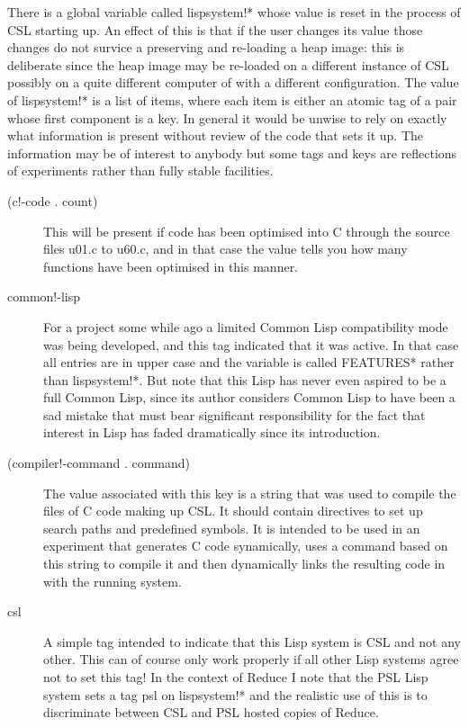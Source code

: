 \documentclass[a4paper,11pt]{article}
\begin{document}
There is a global variable called {\ttfamily lispsystem!*} whose value is
reset in the process of CSL starting up. An effect of this is that if the
user changes its value those changes do not survice a preserving and
re-loading a heap image: this is deliberate since the heap image may be
re-loaded on a different instance of CSL possibly on a quite different
computer of with a different configuration. The value of {\ttfamily
lispsystem!*} is a list of items, where each item is either an atomic tag
of a pair whose first component is a key. In general it would be unwise
to rely on exactly what information is present without review of the code
that sets it up. The information may be of interest to anybody but some tags
and keys are reflections of experiments rather than fully stable facilities.
\begin{description}

\item[{\ttfamily (c!-code . count)}]
This will be present if code has been optimised into C through the source
files u01.c to u60.c, and in that case the value tells you how many functions
have been optimised in this manner.
  

\item[{\ttfamily  common!-lisp}]
For a project some while ago a limited Common Lisp compatibility mode was
being developed, and this tag indicated that it was active. In that case all
entries are in upper case and the variable is called {\ttfamily *FEATURES*}
rather than {\ttfamily lispsystem!*}. But note that this Lisp has never even
aspired to be a full Common Lisp, since its author considers Common Lisp to
have been a sad mistake that must bear significant responsibility for the
fact that interest in Lisp has faded dramatically since its introduction.
  

\item[{\ttfamily (compiler!-command . command)}]
The value associated with this key is a string that was used to compile the
files of C code making up CSL. It should contain directives to set up
search paths and predefined symbols. It is intended to be used in an
experiment that generates C code synamically, uses a command based on this
string to compile it and then dynamically links the resulting code in with
the running system.

\item[{\ttfamily csl}]
A simple tag intended to indicate that this Lisp system is CSL and not any
other. This can of course only work properly if all other Lisp systems
agree not to set this tag! In the context of Reduce I note that the PSL
Lisp system sets a tag {\ttfamily psl} on {\ttfamily lispsystem!*} and
the realistic use of this is to discriminate between CSL and PSL hosted
copies of Reduce.


\end{description}
\end{document}
